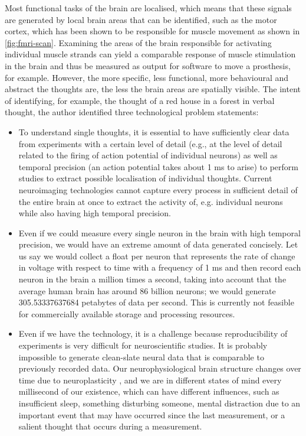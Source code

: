 Most functional tasks of the brain are localised, which means that these signals are generated by local brain areas that can be identified, such as the motor cortex, which has been shown to be responsible for muscle movement as shown in \autoref{fig:fmri-scan}. Examining the areas of the brain responsible for activating individual muscle strands can yield a comparable response of muscle stimulation in the brain and thus be measured as output for software to move a prosthesis, for example. However, the more specific, less functional, more behavioural and abstract the thoughts are, the less the brain areas are spatially visible. The intent of identifying, for example, the thought of a red house in a forest in verbal thought, the author identified three technological problem statements:

\begin{itemize}
  \item To understand single thoughts, it is essential to have sufficiently clear data from experiments with a certain level of detail (e.g., at the level of detail related to the firing of action potential of individual neurons) as well as temporal precision (an action potential takes about 1 ms to arise) to perform studies to extract possible localisation of individual thoughts. Current neuroimaging technologies cannot capture every process in sufficient detail of the entire brain at once to extract the activity of, e.g. individual neurons while also having high temporal precision.
  \item Even if we could measure every single neuron in the brain with high temporal precision, we would have an extreme amount of data generated concisely. Let us say we would collect a float per neuron that represents the rate of change in voltage with respect to time with a frequency of 1 ms and then record each neuron in the brain a million times a second, taking into account that the average human brain has around 86 billion neurons; we would generate 305.53337637684 petabytes of data per second. This is currently not feasible for commercially available storage and processing resources.
  \item Even if we have the technology, it is a challenge because reproducibility of experiments is very difficult for neuroscientific studies. It is probably impossible to generate clean-slate neural data that is comparable to previously recorded data. Our neurophysiological brain structure changes over time due to neuroplasticity \citep{puderbaugh_neuroplasticity_2022}, and we are in different states of mind every millisecond of our existence, which can have different influences, such as insufficient sleep, something disturbing someone, mental distraction due to an important event that may have occurred since the last measurement, or a salient thought that occurs during a measurement.
\end{itemize}

